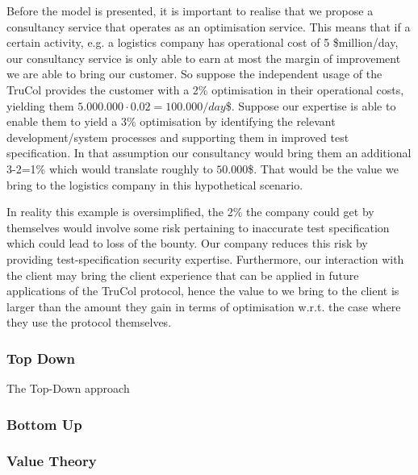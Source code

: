 Before the model is presented, it is important to realise that we propose a consultancy service that operates as an optimisation service. This means that if a certain activity, e.g. a logistics company has operational cost of 5 \$million/day, our consultancy service is only able to earn at most the margin of improvement we are able to bring our customer. So suppose the independent usage of the TruCol provides the customer with a 2\% optimisation in their operational costs, yielding them $5.000.000\cdot 0.02=100.000/day$\$. Suppose our expertise is able to enable them to yield a 3\% optimisation by identifying the relevant development/system processes and supporting them in improved test specification. In that assumption our consultancy would bring them an additional 3-2=1\% which would translate roughly to $50.000$\$. That would be the value we bring to the logistics company in this hypothetical scenario.

In reality this example is oversimplified, the 2\% the company could get by themselves would involve some risk pertaining to inaccurate test specification which could lead to loss of the bounty. Our company reduces this risk by providing test-specification security expertise. Furthermore, our interaction with the client may bring the client experience that can be applied in future applications of the TruCol protocol, hence the value to we bring to the client is larger than the amount they gain in terms of optimisation w.r.t. the case where they use the protocol themselves.



\subsubsection{Top Down}\label{subsubsec:model_descriptions_top_down}
The Top-Down approach 
\subsubsection{Bottom Up}\label{subsubsec:model_descriptions_bottom_up}
\subsubsection{Value Theory}\label{subsubsec:model_descriptions_value_theory}